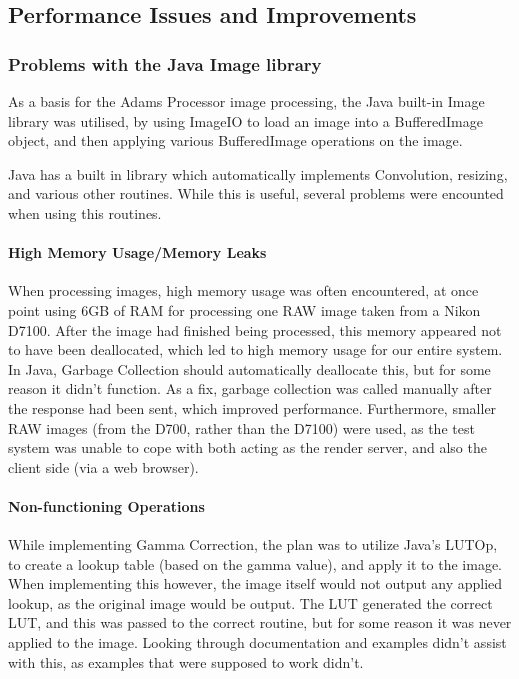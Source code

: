 \documentclass[10pt,a4paper]{article}
\begin{document}
\subsection{Performance Issues and Improvements}
\subsubsection{Problems with the Java Image library}
As a basis for the Adams Processor image processing, the Java built-in Image library was utilised,
by using ImageIO to load an image into a BufferedImage object, and then applying various BufferedImage operations on
the image.

Java has a built in library which automatically implements Convolution, resizing, and various other routines. While
this is useful, several problems were encounted when using this routines. 

\paragraph{High Memory Usage/Memory Leaks}
When processing images, high memory usage was often encountered, at once point using 6GB of RAM for processing 
one RAW image taken from a Nikon D7100. After the image had finished being processed, this memory appeared not to
have been deallocated, which led to high memory usage for our entire system. In Java, Garbage Collection should automatically
deallocate this, but for some reason it didn't function. As a fix, garbage collection was called manually after the response had been sent,
which improved performance. Furthermore, smaller RAW images (from the D700, rather than the D7100) were used, as the test system was unable to cope
with both acting as the render server, and also the client side (via a web browser).

\paragraph{Non-functioning Operations}
While implementing Gamma Correction, the plan was to utilize Java's LUTOp, to create a lookup table (based on the gamma value),
and apply it to the image. When implementing this however, the image itself would not output any applied lookup, as the original image would be output.
The LUT generated the correct LUT, and this was passed to the correct routine, but for some reason it was never applied to the image. Looking through
documentation and examples didn't assist with this, as examples that were supposed to work didn't.
\end{document}
